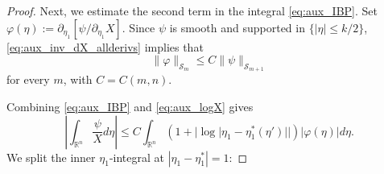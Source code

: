\documentclass[10pt,a4paper]{amsart}
\begin{document}
\begin{proof}
Next, we estimate the second term in the integral \eqref{eq:aux_IBP}. Set $\varphi(\eta):=\partial_{\eta_1}[\psi/\partial_{\eta_1}X]$.
Since $\psi$ is smooth and supported in $\{|\eta|\leq k/2\}$, \eqref{eq:aux_inv_dX_allderivs} implies that
\begin{equation}\label{eq:aux_phi_bound}
  \|\varphi\|_{\mathscr{S}_m}\leq C\|\psi\|_{\mathscr{S}_{m+1}}
\end{equation}
for every $m$, with $C=C(m,n)$.

Combining \eqref{eq:aux_IBP} and \eqref{eq:aux_logX} gives
\begin{equation*}
    \left|\int_{\mathbb{R}^n}\frac{\psi}{X} d\eta\right|
    \leq C\int_{\mathbb{R}^n}\left(1+|\log|\eta_1-\eta_1^*(\eta')||\right) |\varphi(\eta)| d\eta.
\end{equation*}
We split the inner $\eta_1$-integral at $|\eta_1-\eta_1^*|=1$:


\end{proof}
\end{document}
